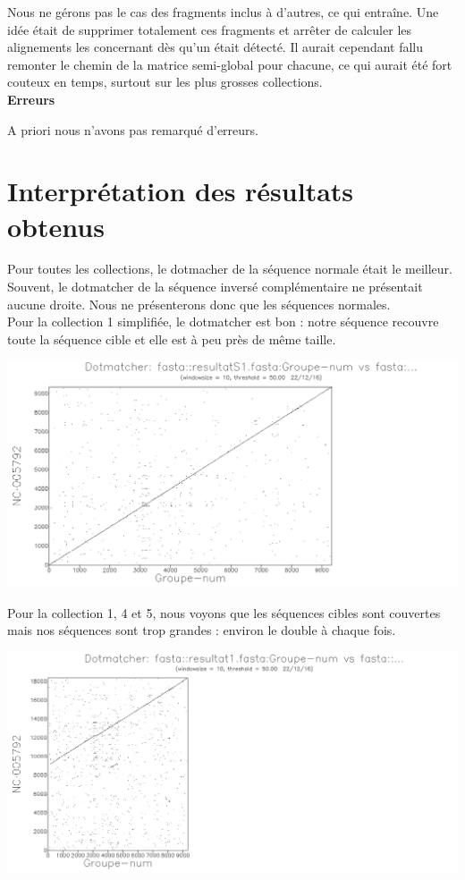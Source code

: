 \documentclass{article}
\begin{document}
Nous ne gérons pas le cas des fragments inclus à d'autres, ce qui entraîne. Une idée était de supprimer totalement ces fragments et arrêter de calculer les alignements les concernant dès qu'un était détecté. Il aurait cependant fallu remonter le chemin de la matrice semi-global pour chacune, ce qui aurait été fort couteux en temps, surtout sur les plus grosses collections. \\

\textbf{Erreurs}
\vspace{1.5mm}

A priori nous n'avons pas remarqué d'erreurs.

\section{Interprétation des résultats obtenus}
Pour toutes les collections, le dotmacher de la séquence normale était le meilleur. Souvent, le dotmatcher de la séquence inversé complémentaire ne présentait aucune droite. Nous ne présenterons donc que les séquences normales.\\

Pour la collection 1 simplifiée, le dotmatcher est bon : notre séquence recouvre toute la séquence cible et elle est à peu près de même taille.
\begin{center}
\includegraphics[scale=0.4]{dotmatcher1S.png}
\end{center}

Pour la collection 1, 4 et 5, nous voyons que les séquences cibles sont couvertes mais nos séquences sont trop grandes : environ le double à chaque fois.

\begin{center}
\includegraphics[scale=0.5]{dotmatcher1.png}
\end{center}
\end{document}
